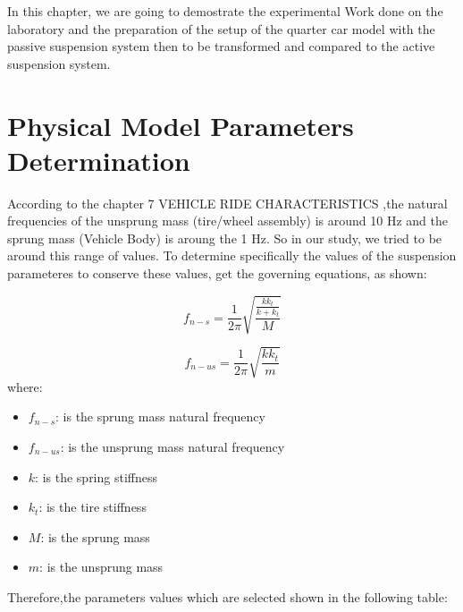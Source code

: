 In this chapter, we are going to demostrate the experimental Work done on the laboratory and the preparation of the setup of the quarter car model with the passive suspension system then to be transformed and compared to the active suspension system.
\section{Physical Model Parameters Determination}
  

According to the chapter 7 VEHICLE RIDE CHARACTERISTICS \cite{wong2001theory},the natural frequencies of the unsprung 
mass (tire/wheel assembly) is around 10 Hz and the sprung mass (Vehicle Body) is aroung the 1 Hz.
So in our study, we tried to be around this range of values.
To determine specifically the values of the suspension parameteres to conserve these values, get the governing equations, as shown:

\begin{equation}
    f_{n-s} =\frac{1}{2\pi} \sqrt{\frac{\frac{k k_{t}}{k+k_{t}} }{M} }
    \label{eqn:3.1}
\end{equation}

\begin{equation}
    f_{n-us} =\frac{1}{2\pi} \sqrt{\frac{k k_{t}}{m }}
    \label{eqn:3.2}
\end{equation}
where: 

\begin{itemize}
    \item \( f_{n-s} \): is the sprung mass natural frequency
    \item \( f_{n-{us}} \): is the unsprung mass natural frequency
    \item \( k \): is the spring stiffness
    \item \( k_{t} \): is the tire stiffness
    \item \( M \): is the sprung mass
    \item \( m \): is the unsprung mass
\end{itemize}

\newpage
Therefore,the parameters values which are selected shown in the following table:

